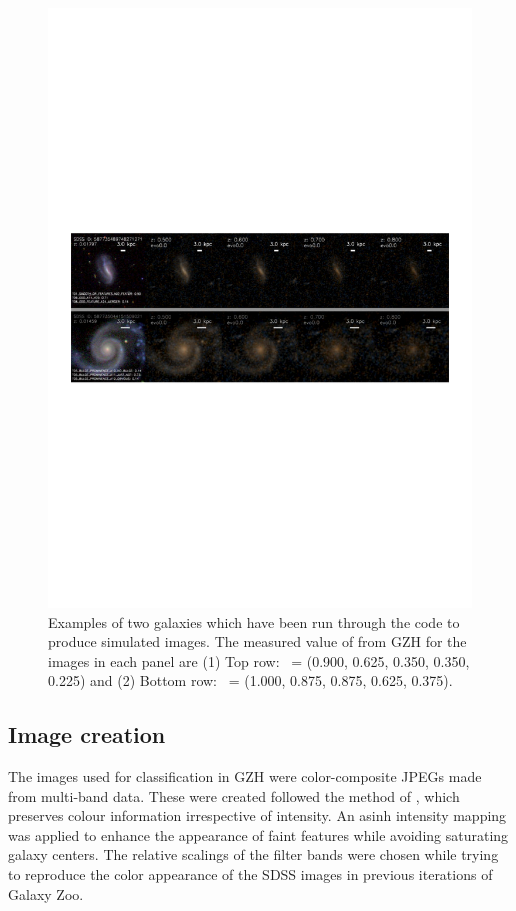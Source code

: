 \documentclass[twocolumn]{aastex6}
\begin{document}
\begin{figure}
\center
\includegraphics[width=160mm]{figures/example_ferengi.pdf}
\caption{Examples of two galaxies which have been run through the \ferengi{}
code to produce simulated \hst{} images. The measured value of \ffeatures{}
from GZH for the images in each panel are (1) Top row: \ffeatures~= (0.900,
0.625, 0.350, 0.350, 0.225) and (2) Bottom row: \ffeatures~= (1.000, 0.875,
0.875, 0.625, 0.375). \label{fig:exampleFERENGI}}
\end{figure}

\subsection{Image creation}\label{ssec:images}

The images used for classification in GZH were color-composite JPEGs made from
multi-band data. These were created followed the method of \citet{lup04}, which
preserves colour information irrespective of intensity.  An asinh intensity
mapping was applied to enhance the appearance of faint features while avoiding
saturating galaxy centers. The relative scalings of the filter bands were
chosen while trying to reproduce the color appearance of the SDSS images in
previous iterations of Galaxy Zoo.
\end{document}
